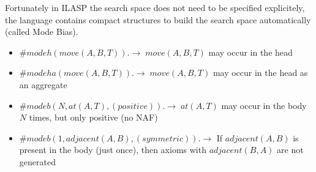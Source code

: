 Fortunately in ILASP the search space does not need to be specified explicitely, 
the language contains compact structures to build the search space automatically (called Mode Bias).
\begin{itemize}
    \item $\#modeh(move(A,B,T)).\rightarrow\; move(A,B,T)$ may occur in the head
    \item $\#modeha(move(A,B,T)).\rightarrow\; move(A,B,T)$ may occur in the head as an aggregate
    \item $\#modeb(N, at(A, T), (positive)).\rightarrow\; at(A,T)$ may occur in the body $N$ times, but only positive (no NAF)
    \item $\#modeb(1, adjacent(A,B), (symmetric)).\rightarrow$ If $adjacent(A,B)$ is present in the body (just once), then axioms 
    with $adjacent(B,A)$ are not generated
\end{itemize}

